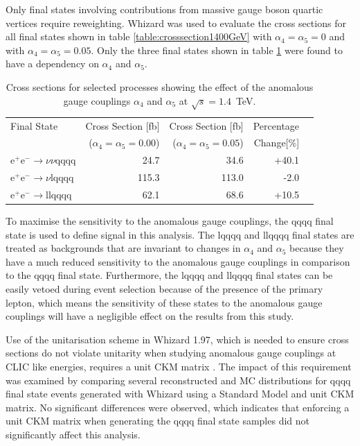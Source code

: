 Only final states involving contributions from massive gauge boson quartic vertices require reweighting.  Whizard was used to evaluate the cross sections for all final states shown in table \ref{table:crosssection1400GeV} with $\alpha_{4}=\alpha_{5}=0$ and with $\alpha_{4}=\alpha_{5}=0.05$.  Only the three final states shown in table \ref{table:crosssectionsensitivity1400} were found to have a dependency on $\alpha_{4}$ and $\alpha_{5}$.  

\begin{table}[h!]
\centering
\begin{tabular}{ l r r r r }
\hline
Final State & Cross Section [fb] & Cross Section [fb] & Percentage \\ 
& ($\alpha_{4} = \alpha_{5} = 0.00$) & ($\alpha_{4} = \alpha_{5} = 0.05$) & Change[\%] \\ 
\hline
$\text{e}^{+}\text{e}^{-} \rightarrow \nu{\nu}\text{qqqq}$ & 24.7 & 34.6 & +40.1 \\
$\text{e}^{+}\text{e}^{-} \rightarrow \nu\text{lqqqq}$ & 115.3 & 113.0 & -2.0 \\
$\text{e}^{+}\text{e}^{-} \rightarrow \text{llqqqq}$ & 62.1 & 68.6 & +10.5 \\
\hline
\end{tabular}
\caption[Cross sections for selected processes showing the effect of the anomalous gauge couplings $\alpha_{4}$ and $\alpha_{5}$ at $\sqrt{s}=1.4$~TeV.]{Cross sections for selected processes showing the effect of the anomalous gauge couplings $\alpha_{4}$ and $\alpha_{5}$ at $\sqrt{s}=1.4$~TeV.}
\label{table:crosssectionsensitivity1400}
\end{table}

To maximise the sensitivity to the anomalous gauge couplings, the \nu{\nu}qqqq final state is used to define signal in this analysis.  The l{\nu}qqqq and llqqqq final states are treated as backgrounds that are invariant to changes in $\alpha_{4}$ and $\alpha_{5}$ because they have a much reduced sensitivity to the anomalous gauge couplings in comparison to the \nu{\nu}qqqq final state.  Furthermore, the l{\nu}qqqq and llqqqq final states can be easily vetoed during event selection because of the presence of the primary lepton, which means the sensitivity of these states to the anomalous gauge couplings will have a negligible effect on the results from this study.

Use of the unitarisation scheme in Whizard 1.97, which is needed to ensure cross sections do not violate unitarity when studying anomalous gauge couplings at CLIC like energies, requires a unit CKM matrix \cite{WhizardManual}.  The impact of this requirement was examined by comparing several reconstructed and MC distributions for \nu{\nu}qqqq final state events generated with Whizard using a Standard Model and unit CKM matrix.  No significant differences were observed, which indicates that enforcing a unit CKM matrix when generating the \nu{\nu}qqqq final state samples did not significantly affect this analysis.  

